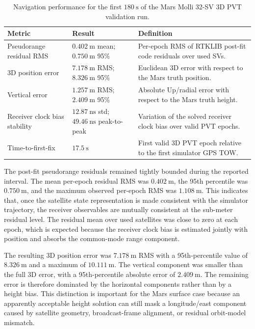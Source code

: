 \begin{table}[t]
    \centering
    \caption{Navigation performance for the first \(180~\mathrm{s}\) of the Mars Molli 32-SV 3D PVT validation run.}
    \label{tab:mars_molli_navigation_performance}
    \begin{tabular}{lll}
        \toprule
        Metric & Result & Definition \\
        \midrule
        Pseudorange residual RMS
            & \(0.402~\mathrm{m}\) mean; \(0.750~\mathrm{m}\) 95\%
            & Per-epoch RMS of RTKLIB post-fit code residuals over used SVs. \\
        3D position error
            & \(7.178~\mathrm{m}\) RMS; \(8.326~\mathrm{m}\) 95\%
            & Euclidean 3D error with respect to the Mars truth position. \\
        Vertical error
            & \(1.257~\mathrm{m}\) RMS; \(2.409~\mathrm{m}\) 95\%
            & Absolute Up/radial error with respect to the Mars truth height. \\
        Receiver clock bias stability
            & \(12.87~\mathrm{ns}\) std; \(49.46~\mathrm{ns}\) peak-to-peak
            & Variation of the solved receiver clock bias over valid PVT epochs. \\
        Time-to-first-fix
            & \(17.5~\mathrm{s}\)
            & First valid 3D PVT epoch relative to the first simulator GPS TOW. \\
        \bottomrule
    \end{tabular}
\end{table}

The post-fit pseudorange residuals remained tightly bounded during the reported
interval. The mean per-epoch residual RMS was \(0.402~\mathrm{m}\), the 95th
percentile was \(0.750~\mathrm{m}\), and the maximum observed per-epoch RMS was
\(1.108~\mathrm{m}\). This indicates that, once the satellite state representation is
made consistent with the simulator trajectory, the receiver observables are mutually
consistent at the sub-meter residual level. The residual mean over used satellites was
close to zero at each epoch, which is expected because the receiver clock bias is
estimated jointly with position and absorbs the common-mode range component.

The resulting 3D position error was \(7.178~\mathrm{m}\) RMS with a 95th-percentile
value of \(8.326~\mathrm{m}\) and a maximum of \(10.111~\mathrm{m}\). The vertical
component was smaller than the full 3D error, with a 95th-percentile absolute error of
\(2.409~\mathrm{m}\). The remaining error is therefore dominated by the horizontal
components rather than by a height bias. This distinction is important for the Mars
surface case because an apparently acceptable height solution can still mask a
longitude/east component caused by satellite geometry, broadcast-frame alignment, or
residual orbit-model mismatch.

